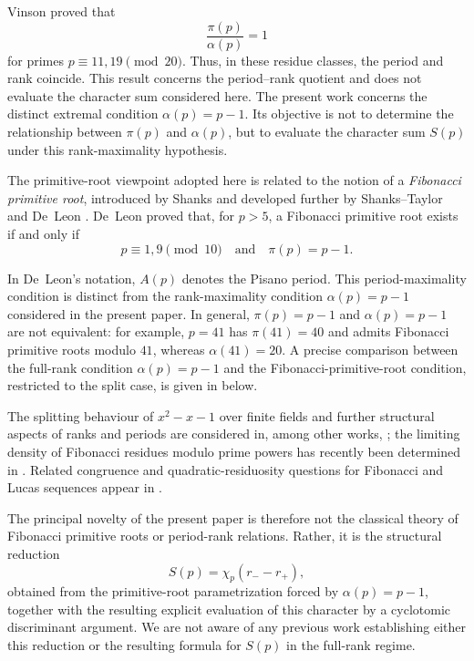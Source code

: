 \documentclass[preprint,12pt]{elsarticle}
\numberwithin{equation}{section}
\theoremstyle{plain}
\theoremstyle{definition}
\begin{document}
Vinson \cite[Theorem~4(i)]{Vinson1963} proved that
\[
\frac{\pi(p)}{\alpha(p)}=1
\]
for primes $p\equiv11,19\pmod{20}$. Thus, in these residue classes,
the period and rank coincide. This result concerns the period--rank
quotient and does not evaluate the character sum considered here.
The present work concerns the distinct extremal condition
$\alpha(p)=p-1$. Its objective is not to determine the relationship
between $\pi(p)$ and $\alpha(p)$, but to evaluate the character sum
$S(p)$ under this rank-maximality hypothesis.
 
The primitive-root viewpoint adopted here is related to the notion of
a \emph{Fibonacci primitive root}, introduced by Shanks
\cite{Shanks1972} and developed further by Shanks--Taylor
\cite{ShanksTaylor1973} and De~Leon \cite{DeLeon1977}. De~Leon
\cite[Theorem~1]{DeLeon1977} proved that, for $p>5$, a Fibonacci
primitive root exists if and only if
\[
p\equiv1,9\pmod{10}
\quad\text{and}\quad
\pi(p)=p-1.
\]
 
In De~Leon's notation, $A(p)$ denotes the Pisano period. This
period-maximality condition is distinct from the rank-maximality
condition $\alpha(p)=p-1$ considered in the present paper. In general,
$\pi(p)=p-1$ and $\alpha(p)=p-1$ are not equivalent: for example,
$p=41$ has $\pi(41)=40$ and admits Fibonacci primitive
roots modulo $41$, whereas $\alpha(41)=20$.
A precise comparison between the full-rank condition $\alpha(p)=p-1$
and the Fibonacci-primitive-root condition, restricted to the split
case, is given in  below.
 
The splitting behaviour of $x^2-x-1$ over finite fields and further
structural aspects of ranks and periods are considered in, among
other works, \cite{GuptaRockstrohSu2012,Renault2013,BallotElia2007,
SomerKrizek2015,FiebigMbirikaSpilker2025,JavaheriKrylov2020};
the limiting density of Fibonacci residues modulo prime powers has
recently been determined in \cite{BragmanRowland2025}.
Related congruence and quadratic-residuosity questions for Fibonacci
and Lucas sequences appear in \cite{Williams1982,SunSun1992,Sun2003,
BerndtEvansWilliams1998}.
 
The principal novelty of the present paper is therefore not the
classical theory of Fibonacci primitive roots or period-rank
relations. Rather, it is the structural reduction
\[
S(p)=\chi_p(r_- - r_+),
\]
obtained from the primitive-root parametrization forced by
$\alpha(p)=p-1$, together with the resulting explicit evaluation of
this character by a cyclotomic discriminant argument. We are not aware of any previous work establishing either this
reduction or the resulting formula for $S(p)$ in the full-rank regime.
 
\end{document}
